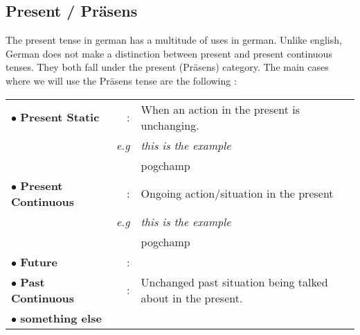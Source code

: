 \documentclass[a4paper,12pt]{article}
\begin{document}
\subsection{\bf{Present / Präsens}}
\begin{adjustwidth}{2em}{0pt}
\label{sec:present}

The present tense in german has a multitude of uses in german. Unlike english,
German does not make a distinction between present and present continuous
tenses. They both fall under the present (Präsens) category. The main cases
where we will use the Präsens tense are the following : \\


\vspace{0.3cm}
\begin{tabular}{l r l l}

\rowcolor{white} $\bullet$  \textbf{Present Static} & : & When an action in the present
is unchanging. &\\

\rowcolor{white}  & \color{gray} \textit{e.g} \color{black} & \color{gray} \textit{this is the example} \color{black} &\\
\rowcolor{white} & & pogchamp \\

\rowcolor{white} $\bullet$  \textbf{Present Continuous} & : & Ongoing action/situation in
the present &\\ 

\rowcolor{white}  & \color{gray} \textit{e.g} \color{black} & \color{gray}
\textit{this is the example} \color{black} &\\
\rowcolor{white} & & pogchamp &\\

\rowcolor{white} $\bullet$  \textbf{Future} & : & &\\


\rowcolor{white} $\bullet$  \textbf{Past Continuous} & : & Unchanged past situation being
talked about in the present.&\\



\rowcolor{white} $\bullet$  \textbf{something else}  & & &\\



\end{tabular}
\vspace{0.3cm}
\newline


\end{adjustwidth}
\end{document}
